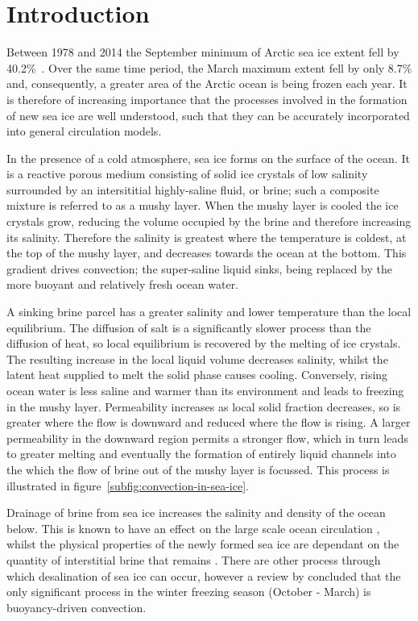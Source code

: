 \documentclass[11pt]{proc}
\begin{document}
\section{Introduction}
\label{sec:intro}

Between 1978 and 2014 the September minimum of Arctic sea ice extent fell by 40.2\%~\citep*{fetterer-02}. Over the same time period, the March maximum extent fell by only 8.7\% and, consequently, a greater area of the Arctic ocean is being frozen each year. It is therefore of increasing importance that the processes involved in the formation of new sea ice are well understood, such that they can be accurately incorporated into general circulation models. 

In the presence of a cold atmosphere, sea ice forms on the surface of the ocean. It is a reactive porous medium consisting of solid ice crystals of low salinity surrounded by an intersititial highly-saline fluid, or brine; such a composite mixture is referred to as a mushy layer. When the mushy layer is cooled the ice crystals grow, reducing the volume occupied by the brine and therefore increasing its salinity. Therefore the salinity is greatest where the temperature is coldest, at the top of the mushy layer, and decreases towards the ocean at the bottom. This gradient drives convection; the super-saline liquid sinks, being replaced by the more buoyant and relatively fresh ocean water. 

A sinking brine parcel has a greater salinity and lower temperature than the local equilibrium. The diffusion of salt is a significantly slower process than the diffusion of heat, so local equilibrium is recovered by the melting of ice crystals. The resulting increase in the local liquid volume decreases salinity, whilst the latent heat supplied to melt the solid phase causes cooling. Conversely, rising ocean water is less saline and warmer than its environment and leads to freezing in the mushy layer. Permeability increases as local solid fraction decreases, so is greater where the flow is downward and reduced where the flow is rising. A larger permeability in the downward region permits a stronger flow, which in turn leads to greater melting and eventually the formation of entirely liquid channels into the which the flow of brine out of the mushy layer is focussed. This process is illustrated in figure~\ref{subfig:convection-in-sea-ice}.

Drainage of brine from sea ice increases the salinity and density of the ocean below. This is known to have an effect on the large scale ocean circulation \citep*{brandon-et-al-10}, whilst the physical properties of the newly formed sea ice are dependant on the quantity of interstitial brine that remains \citep*{petrich-eicken-10}. There are other process through which desalination of sea ice can occur, however a review by \citet*{notz-worster-09} concluded that the only significant process in the winter freezing season (October - March) is buoyancy-driven convection. 
\end{document}
